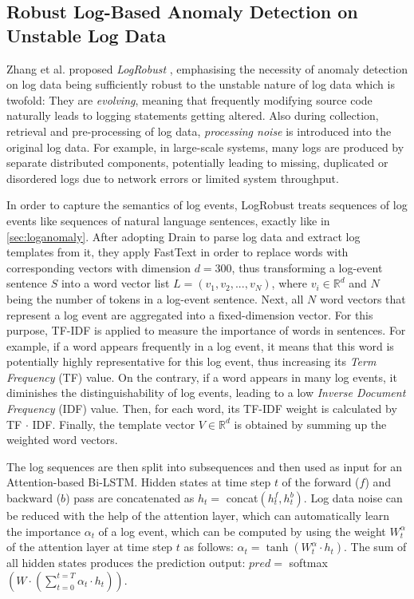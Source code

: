 \subsection{Robust Log-Based Anomaly Detection on Unstable Log Data\label{sec:logrobust}}
Zhang et al. proposed \textit{LogRobust} \cite{zhang2019robust}, emphasising the necessity of anomaly detection on log data being sufficiently robust to the unstable nature of log data which is twofold: They are \textit{evolving}, meaning that frequently modifying source code naturally leads to logging statements getting altered. Also during collection, retrieval and pre-processing of log data, \textit{processing noise} is introduced into the original log data. For example, in large-scale systems, many logs are produced by separate distributed components, potentially leading to missing, duplicated or disordered logs due to network errors or limited system throughput.

In order to capture the semantics of log events, LogRobust treats sequences of log events like sequences of natural language sentences, exactly like in \ref{sec:loganomaly}. After adopting Drain to parse log data and extract log templates from it, they apply FastText \cite{joulin2016fasttext} in order to replace words with corresponding vectors with dimension $d=300$, thus transforming a log-event sentence $S$ into a word vector list $L = (v_1,v_2,...,v_N)$, where $v_i \in \mathbb{R}^d$ and $N$ being the number of tokens in a log-event sentence. Next, all $N$ word vectors that represent a log event are aggregated into a fixed-dimension vector. For this purpose, TF-IDF is applied to measure the importance of words in sentences. For example, if a word appears frequently in a log event, it means that this word is potentially highly representative for this log event, thus increasing its \textit{Term Frequency} (TF) value. On the contrary, if a word appears in many log events, it diminishes the distinguishability of log events, leading to a low \textit{Inverse Document Frequency} (IDF) value. Then, for each word, its TF-IDF weight is calculated by TF $\cdot$ IDF. Finally, the template vector $V \in \mathbb{R}^d$ is obtained by summing up the weighted word vectors.

The log sequences are then split into subsequences and then used as input for an Attention-based Bi-LSTM. Hidden states at time step $t$ of the forward ($f$) and backward ($b$) pass are concatenated as $h_t =$ concat$(h_t^f, h_t^b)$. Log data noise can be reduced with the help of the attention layer, which can automatically learn the importance $\alpha_t$ of a log event, which can be computed by using the weight $W_t^\alpha$ of the attention layer at time step $t$ as follows: $\alpha_t = \tanh(W^\alpha_t \cdot h_t)$. The sum of all hidden states produces the prediction output: $pred = $ softmax $(W \cdot (\sum_{t=0}^{t=T} \alpha_t \cdot h_t))$.

